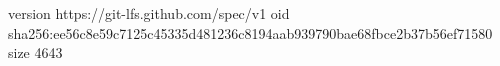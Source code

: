 version https://git-lfs.github.com/spec/v1
oid sha256:ee56c8e59c7125c45335d481236c8194aab939790bae68fbce2b37b56ef71580
size 4643
